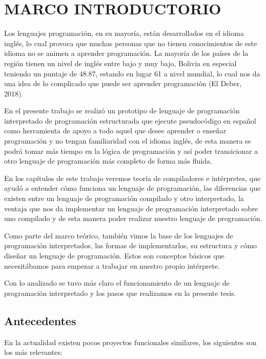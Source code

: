 \chapter{MARCO INTRODUCTORIO}
Los lenguajes programación, en su mayoría, están desarrollados en el idioma inglés, lo cual provoca que muchas personas que no tienen conocimientos de este idioma no se animen a aprender programación. La mayoría de los países de la región tienen un nivel de inglés entre bajo y muy bajo, Bolivia en especial teniendo un puntaje de 48.87, estando en lugar 61 a nivel mundial, lo cual nos da una idea de lo complicado que puede ser aprender programación (El Deber, 2018).

En el presente trabajo se realizó un prototipo de lenguaje de programación interpretado de programación estructurada que ejecute pseudocódigo en español como herramienta de apoyo a todo aquel que desee aprender o enseñar programación y no tengan familiaridad con el idioma inglés, de esta manera se podrá tomar más tiempo en la lógica de programación y así poder transicionar a otro lenguaje de programación más completo de forma más fluida.

En los capítulos de este trabajo veremos teoría de compiladores e intérpretes, que ayudó a entender cómo funciona un lenguaje de programación, las diferencias que existen entre un lenguaje de programación compilado y otro interpretado, la ventaja que nos da implementar un lenguaje de programación interpretado sobre uno compilado y de esta manera poder realizar nuestro lenguaje de programación.

Como parte del marco teórico, también vimos la base de los lenguajes de programación interpretados, las formas de implementarlos, su estructura y cómo diseñar un lenguaje de programación. Estos son conceptos básicos que necesitábamos para empezar a trabajar en nuestro propio intérprete.

Con lo analizado se tuvo más claro el funcionamiento de un lenguaje de programación interpretado y los pasos que realizamos en la presente tesis.

\section{Antecedentes}

En la actualidad existen pocos proyectos funcionales similares, los siguientes son los más relevantes:

